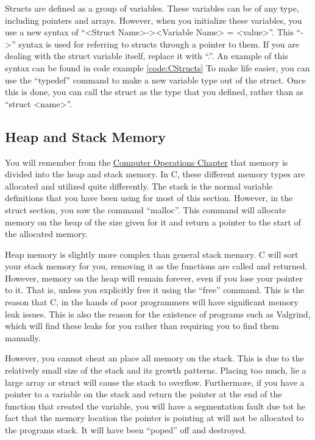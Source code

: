 \documentclass[a4paper,11pt]{report}
\begin{document}
			Structs are defined as a group of variables. 
			These variables can be of any type, including pointers and arrays. 
			However, when you initialize these variables, you use a new syntax of ``<Struct Name>-><Variable Name> = <value>''. 
			This ``->'' syntax is used for referring to structs through a pointer to them. 
			If you are dealing with the struct variable itself, replace it with ``.''. 
			An example of this syntax can be found in code example \ref{code:CStructs}	
			To make life easier, you can use the ``typedef'' command to make a new variable type out of the struct. 
			Once this is done, you can call the struct as the type that you defined, rather than as ``struct <name>''. 

			\begin{code}
				C}]{./CStructs.c}
				\caption{Example of a C Struct}
				\label{code:CStructs}
			\end{code}
		\subsection{Heap and Stack Memory}
			You will remember from the \hyperref[ch:ComputerOperations]{Computer Operations Chapter} that memory is divided into the heap and stack memory. 
			In C, these different memory types are allocated and utilized quite differently. 
			The stack is the normal variable definitions that you have been using for most of this section. 
			However, in the struct section, you saw the command ``malloc''. 
			This command will allocate memory on the heap of the size given for it and return a pointer to the start of the allocated memory. 
			
			Heap memory is slightly more complex than general stack memory. 
			C will sort your stack memory for you, removing it as the functions are called and returned. 
			However, memory on the heap will remain forever, even if you lose your pointer to it. 
			That is, unless you explicitly free it using the ``free'' command. 
			This is the reason that C, in the hands of poor programmers will have significant memory leak issues. 
			This is also the reason for the existence of programs such as Valgrind, which will find these leaks for you rather than requiring you to find them manually. 
			
			However, you cannot cheat an place all memory on the stack. 
			This is due to the relatively small size of the stack and its growth patterns. 
			Placing too much, lie a large array or struct will cause the stack to overflow. 
			Furthermore, if you have a pointer to a variable on the stack and return the pointer at the end of the function that created the variable, 
			you will have a segmentation fault due tot he fact that the memory location the pointer is pointing at will not be allocated to the programs stack. 
			It will have been ``poped'' off and destroyed. 
\end{document}
